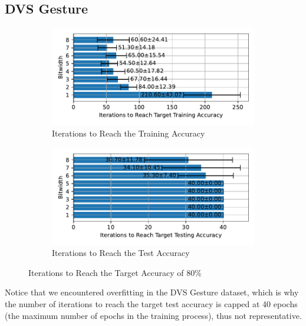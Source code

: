     \subsection{DVS Gesture}
    \label{appendix:iterations_dvs_gesture}
        \begin{figure}[H]
            \centering
            \begin{subfigure}[H]{0.6\textwidth}
                \centering
                \includegraphics[width=\textwidth]{../standard/DVSGesture/plots/dvsgesture_train_iters_horizontal.pdf}
                \caption{Iterations to Reach the Training Accuracy}
            \end{subfigure}
            \hfill
            \begin{subfigure}[H]{0.6\textwidth}
                \centering
                \includegraphics[width=\textwidth]{../standard/DVSGesture/plots/dvsgesture_test_iters_horizontal.pdf}
                \caption{Iterations to Reach the Test Accuracy}
            \end{subfigure}
            \caption{Iterations to Reach the Target Accuracy of 80\%}
        \end{figure}

    Notice that we encountered overfitting in the DVS Gesture dataset, which is why the number of iterations to reach the target test accuracy is capped at 40 epochs (the maximum number of epochs in the training process), thus not representative. 

